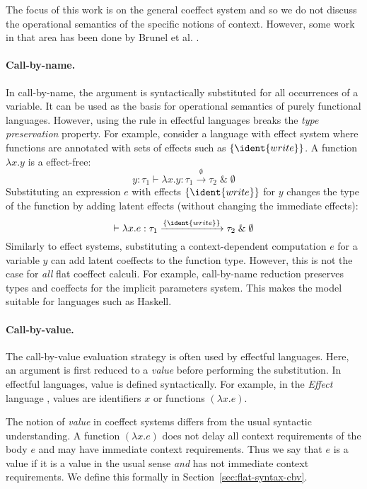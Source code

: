 The focus of this work is on the general coeffect system and so we do not discuss the operational
semantics of the specific notions of context. However, some work in that area has been done
by Brunel et al. \cite{coeffects-quantitative}.

\paragraph{Call-by-name.} 
In call-by-name, the argument is syntactically substituted for all occurrences of a variable. It
can be used as the basis for operational semantics of purely functional languages. However, using
the rule in effectful languages breaks the \emph{type preservation} property. For example, consider
a language with effect system where functions are annotated with sets of effects such as $\{ \ident{write} \}$.
A function $\lambda x.y$ is a effect-free:
%
\begin{equation*}
y\!:\!\tau_1 \vdash \lambda x.y : \tau_1 \xrightarrow{\emptyset} \tau_2 \;\&\; \emptyset
\end{equation*}
%
Substituting an expression $e$ with effects $\{ \ident{write} \}$ for $y$ changes the type of 
the function by adding latent effects (without changing the immediate effects):
%
\begin{equation*}
\vdash \lambda x.e : \tau_1 \xrightarrow{ \{ \ident{write} \} } \tau_2 \;\&\; \emptyset
\end{equation*}
%
Similarly to effect systems, substituting a context-dependent computation $e$ for a variable $y$ can
add latent coeffects to the function type. However, this is not the case for \emph{all} flat coeffect
calculi. For example, call-by-name reduction preserves types and coeffects for the implicit 
parameters system. This makes the model suitable for languages such as Haskell.

\paragraph{Call-by-value.}

The call-by-value evaluation strategy is often used by effectful languages. Here, an argument is
first reduced to a \emph{value} before performing the substitution. In effectful languages, 
value is defined syntactically. For example, in the \emph{Effect} language \cite{monads-effects-marriage},
values are identifiers $x$ or functions $(\lambda x.e)$.

The notion of \emph{value} in coeffect systems differs from the usual syntactic understanding.
A function $(\lambda x.e)$ does not delay all context requirements of the body $e$ and may have
immediate context requirements. Thus we say that $e$ is a value if it is a value in the usual
sense \emph{and} has not immediate context requirements. We define this formally in 
Section~\ref{sec:flat-syntax-cbv}.

